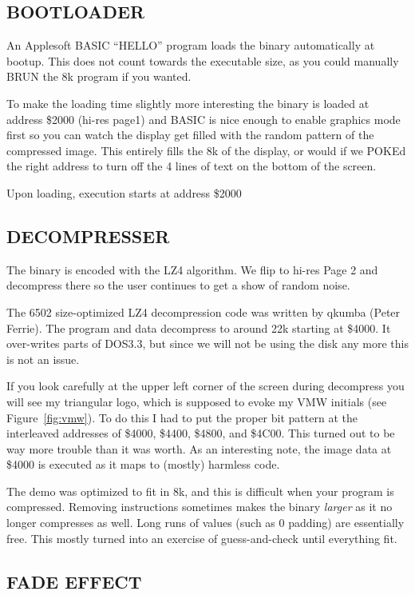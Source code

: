 \documentclass[twocolumn]{article}
\begin{document}
\subsection{BOOTLOADER}

An Applesoft BASIC ``HELLO'' program loads the binary automatically at bootup.
This does not count towards the executable size, as you could manually BRUN 
the 8k program if you wanted.

To make the loading time slightly more interesting the binary is loaded at
address \$2000 (hi-res page1) and BASIC is nice enough to enable
graphics mode first so you can watch the display get filled with the random
pattern of the compressed image.
This entirely fills the 8k of the display, or would
if we POKEd the right address to turn off
the 4 lines of text on the bottom of the screen.

Upon loading, execution starts at address \$2000

\subsection{DECOMPRESSER}

The binary is encoded with the LZ4 algorithm.
We flip to hi-res Page 2 and decompress there so the user continues to get
a show of random noise.

The 6502 size-optimized LZ4 decompression code was written by qkumba
(Peter Ferrie).
The program and data decompress to around 22k starting at \$4000.
It over-writes parts of DOS3.3, but since we will not be using the disk 
any more this is not an issue.

If you look carefully at the upper left corner of the screen during
decompress you will see my triangular logo, which is supposed to evoke
my VMW initials (see Figure~\ref{fig:vmw}).
To do this I had to put the proper bit pattern at the interleaved
addresses of \$4000, \$4400, \$4800, and \$4C00.  
This turned out to be way more trouble than it was worth.
As an interesting note, the image data at \$4000 is executed as it maps
to (mostly) harmless code.

The demo was optimized to fit in 8k, and this is difficult when your program
is compressed.
Removing instructions sometimes makes the binary {\em larger} as it no longer
compresses as well.
Long runs of values (such as 0 padding) are essentially free.
This mostly turned into an exercise of guess-and-check until everything fit.

\subsection{FADE EFFECT}
\end{document}
